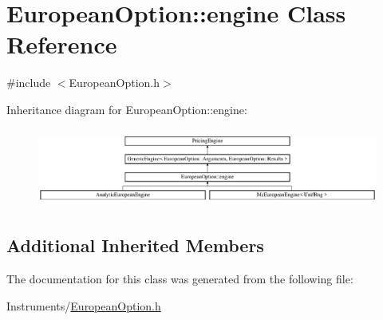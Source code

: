 \hypertarget{class_european_option_1_1engine}{}\section{European\+Option\+:\+:engine Class Reference}
\label{class_european_option_1_1engine}


{\ttfamily \#include $<$European\+Option.\+h$>$}

Inheritance diagram for European\+Option\+:\+:engine\+:\begin{figure}[H]
\begin{center}
\leavevmode
\includegraphics[height=2.586605cm]{class_european_option_1_1engine}
\end{center}
\end{figure}
\subsection*{Additional Inherited Members}


The documentation for this class was generated from the following file\+:\begin{DoxyCompactItemize}
\item 
Instruments/\hyperlink{_european_option_8h}{European\+Option.\+h}\end{DoxyCompactItemize}
